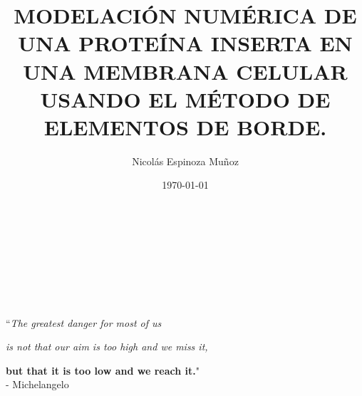 \documentclass[12pt, oneside, numbers, spanish]{ezthesis}
\date{\today}
\author{Nicolás Espinoza Muñoz}
\title{MODELACIÓN NUMÉRICA DE UNA PROTEÍNA INSERTA EN UNA MEMBRANA CELULAR USANDO EL MÉTODO DE ELEMENTOS DE BORDE.}
\numberwithin{equation}{section}
\begin{document}



\newpage
\noindent
\\\\\\\\\\\\
\large{``\textit{The greatest danger for most of us}}
\begin{center}
\large{\textit{is not that our aim is too high and we miss it,}}
\end{center}
\begin{flushright}
\large{\textbf{but that it is too low and we reach it.}"\\}\bigskip
- Michelangelo
\end{flushright}
\newpage
\tableofcontents
\newpage
\end{document}

